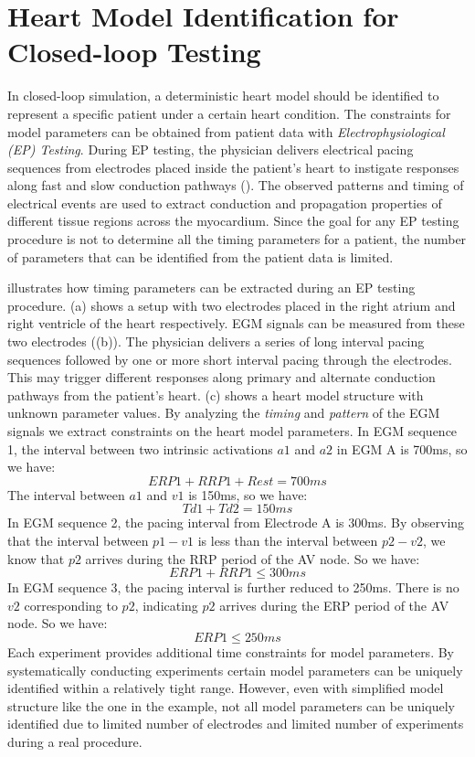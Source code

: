 \section{Heart Model Identification for Closed-loop Testing}
In closed-loop simulation, a deterministic heart model should be identified to represent a specific patient under a certain heart condition. The constraints for model parameters can be obtained from patient data with \emph{Electrophysiological (EP) Testing}. During EP testing, the physician delivers electrical pacing sequences from electrodes placed inside the patient's heart to instigate responses along fast and slow conduction pathways (). The observed patterns and timing of electrical events are used to extract conduction and propagation properties of different tissue regions across the myocardium. Since the goal for any EP testing procedure is not to determine all the timing parameters for a patient, the number of parameters that can be identified from the patient data is limited.    

 illustrates how timing parameters can be extracted during an EP testing procedure. (a) shows a setup with two electrodes placed in the right atrium and right ventricle of the heart respectively. EGM signals can be measured from these two electrodes ((b)). The physician delivers a series of long interval pacing sequences followed by one or more short interval pacing through the electrodes. This may trigger different responses along primary and alternate conduction pathways from the patient's heart. (c) shows a heart model structure with unknown parameter values. By analyzing the \emph{timing} and \emph{pattern} of the EGM signals we extract constraints on the heart model parameters. In EGM sequence 1, the interval between two intrinsic activations $a1$ and $a2$ in EGM A is 700ms, so we have:
$$ERP1+RRP1+Rest=700ms$$
The interval between $a1$ and $v1$ is 150ms, so we have:
$$Td1+Td2=150ms$$
In EGM sequence 2, the pacing interval from Electrode A is 300ms. By observing that the interval between $p1-v1$ is less than the interval between $p2-v2$, we know that $p2$ arrives during the RRP period of the AV node. So we have:
$$ERP1+RRP1\leq 300ms$$
In EGM sequence 3, the pacing interval is further reduced to 250ms. There is no $v2$ corresponding to $p2$, indicating $p2$ arrives during the ERP period of the AV node. So we have:
$$ERP1\leq 250ms$$
Each experiment provides additional time constraints for model parameters. By systematically conducting experiments certain model parameters can be uniquely identified within a relatively tight range. However, even with simplified model structure like the one in the example, not all model parameters can be uniquely identified due to limited number of electrodes and limited number of experiments during a real procedure.






